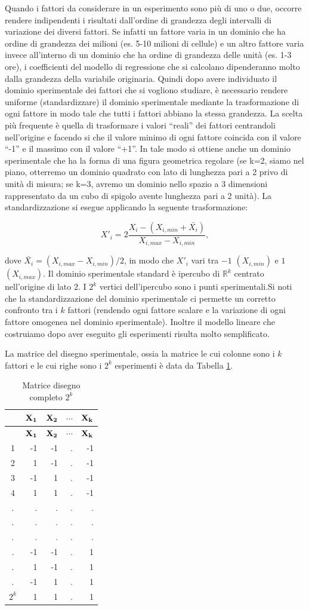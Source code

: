 \documentclass[
  11pt,
]{book}
\begin{document}
Quando i fattori da considerare in un esperimento sono più di uno o due,
occorre rendere indipendenti i risultati dall'ordine di grandezza degli
intervalli di variazione dei diversi fattori. Se infatti un fattore
varia in un dominio che ha ordine di grandezza dei milioni (es. 5-10
milioni di cellule) e un altro fattore varia invece all'interno di un
dominio che ha ordine di grandezza delle unità (es. 1-3 ore), i
coefficienti del modello di regressione che si calcolano dipenderanno
molto dalla grandezza della variabile originaria. Quindi dopo avere
individuato il dominio sperimentale dei fattori che si vogliono
studiare, è necessario rendere uniforme (standardizzare) il dominio
sperimentale mediante la trasformazione di ogni fattore in modo tale che
tutti i fattori abbiano la stessa grandezza. La scelta più frequente è
quella di trasformare i valori ``reali'' dei fattori centrandoli
nell'origine e facendo si che il valore minimo di ogni fattore coincida
con il valore ``-1'' e il massimo con il valore ``+1''. In tale modo si
ottiene anche un dominio sperimentale che ha la forma di una figura
geometrica regolare (se k=2, siamo nel piano, otterremo un dominio
quadrato con lato di lunghezza pari a 2 privo di unità di misura; se
k=3, avremo un dominio nello spazio a 3 dimensioni rappresentato da un
cubo di spigolo avente lunghezza pari a 2 unità). La standardizzazione
si esegue applicando la seguente trasformazione:

\[
X'_i=2\frac{X_i-(X_{i,min}+\bar{X_i})}{X_{i,max}-X_{i,min}},
\]

dove \(\bar{X_i}=(X_{i,max}-X_{i,min})/2\), in modo che \(X'_i\) vari tra
\(-1\) \((X_{i,min})\) e \(1\) \((X_{i,max})\). Il dominio sperimentale standard
è ipercubo di \(\mathbb{R}^k\) centrato nell'origine di lato \(2\). I \(2^k\)
vertici dell'ipercubo sono i punti sperimentali.\newline Si noti che la
standardizzazione del dominio sperimentale ci permette un corretto
confronto tra i \(k\) fattori (rendendo ogni fattore scalare e la
variazione di ogni fattore omogenea nel dominio sperimentale). Inoltre
il modello lineare che costruiamo dopo aver eseguito gli esperimenti
risulta molto semplificato.

La matrice del disegno sperimentale, ossia la matrice le
cui colonne sono i \(k\) fattori e le cui righe sono i \(2^k\) esperimenti è
data da Tabella \ref{tab:MatrDisFull}.

\begin{longtable}[]{@{}crrrr@{}}
\caption{\label{tab:MatrDisFull} Matrice disegno completo \(2^k\)}\tabularnewline
\toprule
& \(\bf{X_1}\) & \(\bf{X_2}\) & \(\cdots\) & \(\bf{X_k}\)\tabularnewline
\midrule
\endfirsthead
\toprule
& \(\bf{X_1}\) & \(\bf{X_2}\) & \(\cdots\) & \(\bf{X_k}\)\tabularnewline
\midrule
\endhead
1 & -1 & -1 & . & -1\tabularnewline
2 & 1 & -1 & . & -1\tabularnewline
3 & -1 & 1 & . & -1\tabularnewline
4 & 1 & 1 & . & -1\tabularnewline
. & . & . & . & .\tabularnewline
. & . & . & . & .\tabularnewline
. & . & . & . & .\tabularnewline
. & -1 & -1 & . & 1\tabularnewline
. & 1 & -1 & . & 1\tabularnewline
. & -1 & 1 & . & 1\tabularnewline
\(2^k\) & 1 & 1 & . & 1\tabularnewline
\bottomrule
\end{longtable}
\end{document}
